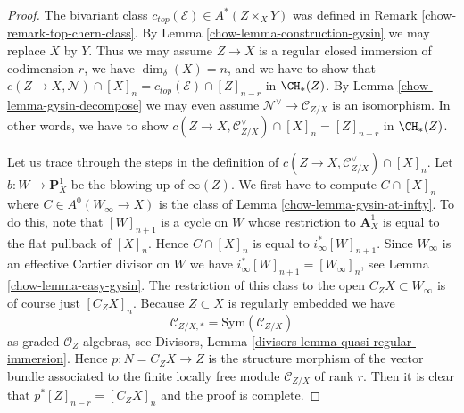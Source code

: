 \begin{proof}

The bivariant class $c_{top}(\mathcal{E}) \in A^*(Z \times_X Y)$ was
defined in Remark \ref{chow-remark-top-chern-class}.
By Lemma \ref{chow-lemma-construction-gysin} we may replace $X$ by $Y$.
Thus we may assume $Z \to X$ is a regular closed immersion
of codimension $r$, we have $\dim_\delta(X) = n$, and we have
to show that $c(Z \to X, \mathcal{N}) \cap [X]_n =
c_{top}(\mathcal{E}) \cap [Z]_{n - r}$ in $\CH_*(Z)$.
By Lemma \ref{chow-lemma-gysin-decompose} we may even assume
$\mathcal{N}^\vee \to \mathcal{C}_{Z/X}$ is an isomorphism.
In other words, we have to show
$c(Z \to X, \mathcal{C}_{Z/X}^\vee) \cap [X]_n = [Z]_{n - r}$ in $\CH_*(Z)$.

\medskip\noindent
Let us trace through the steps in the definition of
$c(Z \to X, \mathcal{C}_{Z/X}^\vee) \cap [X]_n$. Let
$b : W \to \mathbf{P}^1_X$
be the blowing up of $\infty(Z)$. We first have to compute
$C \cap [X]_n$ where $C \in A^0(W_\infty \to X)$ is
the class of Lemma \ref{chow-lemma-gysin-at-infty}.
To do this, note that $[W]_{n + 1}$
is a cycle on $W$ whose restriction to $\mathbf{A}^1_X$ is
equal to the flat pullback of $[X]_n$. Hence $C \cap [X]_n$
is equal to $i_\infty^*[W]_{n + 1}$. Since $W_\infty$ is an
effective Cartier divisor on $W$ we have
$i_\infty^*[W]_{n + 1} = [W_\infty]_n$, see Lemma \ref{chow-lemma-easy-gysin}.
The restriction of this class to the open $C_ZX \subset W_\infty$
is of course just $[C_ZX]_n$. Because $Z \subset X$ is regularly
embedded we have
$$
\mathcal{C}_{Z/X, *} = \text{Sym}(\mathcal{C}_{Z/X})
$$
as graded $\mathcal{O}_Z$-algebras, see
Divisors, Lemma \ref{divisors-lemma-quasi-regular-immersion}.
Hence $p : N = C_ZX \to Z$ is the structure morphism of the
vector bundle associated to the finite locally free module
$\mathcal{C}_{Z/X}$ of rank $r$. Then it is clear that
$p^*[Z]_{n - r} = [C_ZX]_n$ and the proof is complete.
\end{proof}

